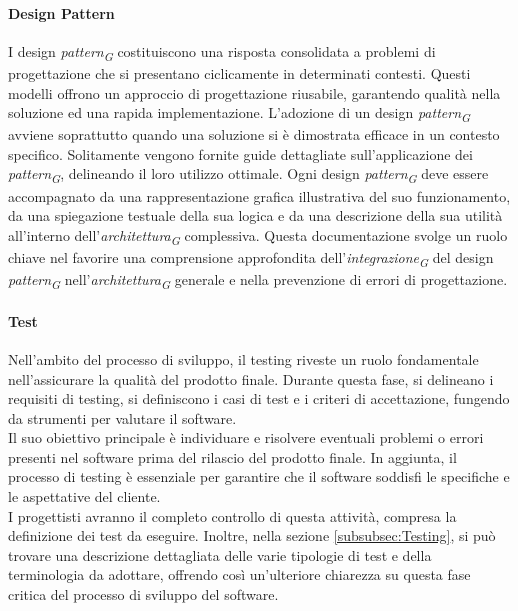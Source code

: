 \paragraph{Design Pattern}
I design \textit{pattern}\textsubscript{\textit{G}} costituiscono una risposta consolidata a problemi di progettazione che si presentano ciclicamente in determinati contesti. Questi modelli offrono un approccio di progettazione riusabile, garantendo qualità nella soluzione ed una rapida implementazione.
L'adozione di un design \textit{pattern}\textsubscript{\textit{G}} avviene soprattutto quando una soluzione si è dimostrata efficace in un contesto specifico. Solitamente vengono fornite guide dettagliate sull'applicazione dei \textit{pattern}\textsubscript{\textit{G}}, delineando il loro utilizzo ottimale.
Ogni design \textit{pattern}\textsubscript{\textit{G}} deve essere accompagnato da una rappresentazione grafica illustrativa del suo funzionamento, da una spiegazione testuale della sua logica e da una descrizione della sua utilità all'interno dell'\textit{architettura}\textsubscript{\textit{G}} complessiva. Questa documentazione svolge un ruolo chiave nel favorire una comprensione approfondita dell'\textit{integrazione}\textsubscript{\textit{G}} del design \textit{pattern}\textsubscript{\textit{G}} nell'\textit{architettura}\textsubscript{\textit{G}} generale e nella prevenzione di errori di progettazione.

\paragraph{Test}
Nell'ambito del processo di sviluppo, il testing riveste un ruolo fondamentale nell'assicurare la qualità del prodotto finale. Durante questa fase, si delineano i requisiti di testing, si definiscono i casi di test e i criteri di accettazione, fungendo da strumenti per valutare il software. \\
Il suo obiettivo principale è individuare e risolvere eventuali problemi o errori presenti nel software prima del rilascio del prodotto finale. In aggiunta, il processo di testing è essenziale per garantire che il software soddisfi le specifiche e le aspettative del cliente. \\
I progettisti avranno il completo controllo di questa attività, compresa la definizione dei test da eseguire. Inoltre, nella sezione \ref{subsubsec:Testing}, si può trovare una descrizione dettagliata delle varie tipologie di test e della terminologia da adottare, offrendo così un'ulteriore chiarezza su questa fase critica del processo di sviluppo del software.

